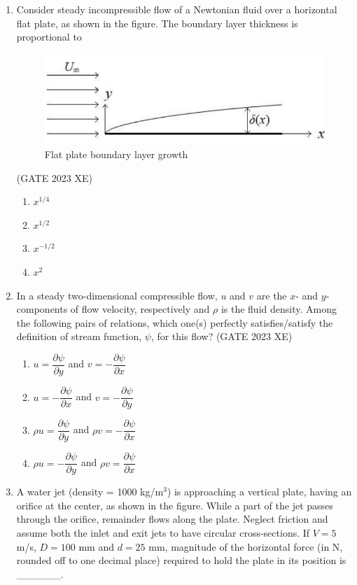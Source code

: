 \documentclass[journal,12pt,onecolumn]{IEEEtran}
\begin{document}
\begin{enumerate}
\item Consider steady incompressible flow of a Newtonian fluid over a horizontal flat
plate, as shown in the figure. The boundary layer thickness is proportional to

\begin{figure}[htbp]
\centering
\includegraphics[width=0.7\columnwidth]{figs/B/fig8.png}
\caption{Flat plate boundary layer growth}
\label{fig:figs/B/fig8.png}
\end{figure}
\hfill{(GATE 2023 XE)}
\begin{multicols}{2}
\begin{enumerate}
\item $x^{1/4}$
\item $x^{1/2}$
\item $x^{-1/2}$
\item $x^2$
\end{enumerate}
\end{multicols}

\item In a steady two-dimensional compressible flow, $u$ and $v$ are the $x$- and $y$-
components of flow velocity, respectively and $\rho$ is the fluid density. Among the
following pairs of relations, which one(s) perfectly satisfies/satisfy the definition
of stream function, $\psi$, for this flow?
\hfill{(GATE 2023 XE)}
\begin{multicols}{2}
\begin{enumerate}
\item $u=\dfrac{\partial \psi}{\partial y}$ and $v=-\dfrac{\partial \psi}{\partial x}$
\item $u=-\dfrac{\partial \psi}{\partial x}$ and $v=-\dfrac{\partial \psi}{\partial y}$
\item $\rho u=\dfrac{\partial \psi}{\partial y}$ and $\rho v=-\dfrac{\partial \psi}{\partial x}$
\item $\rho u=-\dfrac{\partial \psi}{\partial y}$ and $\rho v=\dfrac{\partial \psi}{\partial x}$
\end{enumerate}
\end{multicols}

\newpage

\item A water jet (density = 1000 kg/m$^3$) is approaching a vertical plate, having an
orifice at the center, as shown in the figure. While a part of the jet passes through
the orifice, remainder flows along the plate. Neglect friction and assume both the
inlet and exit jets to have circular cross-sections. If $V=5$ m/s, $D=100$ mm and
$d=25$ mm, magnitude of the horizontal force (in N, rounded off to one decimal
place) required to hold the plate in its position is \_\_\_\_\_\_.


\end{enumerate}
\end{document}
